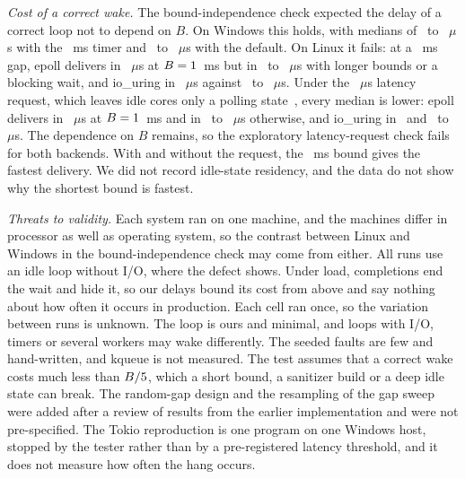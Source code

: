 \emph{Cost of a correct wake.} The bound-independence check expected the delay of a correct loop not to depend on $B$. On
Windows this holds, with medians of \WakeBoundIocpFixedBlockingTimerOneMs\ to
\WakeBoundIocpFixedTenMsTimerOneMs~$\mu$s with the \WakeTimerRequestedMs~ms timer and
\WakeBoundIocpFixedBlockingDefaultTimer\ to \WakeBoundIocpFixedOneHundredMsDefaultTimer~$\mu$s
with the default. On Linux it fails: at a \WakeBoundGapMs~ms gap, epoll delivers in
\WakeBoundEpollFixedOneMs~$\mu$s at $B = 1$~ms but in \WakeBoundEpollFixedTenMs\ to
\WakeBoundEpollFixedOneHundredMs~$\mu$s with longer bounds or a blocking wait, and io\_uring in
\WakeBoundUringFixedOneMs~$\mu$s against \WakeBoundUringFixedOneHundredMs\ to
\WakeBoundUringFixedTenMs~$\mu$s. Under the \WakeQosUs~$\mu$s latency request, which leaves idle
cores only a polling state~\cite{kernel2026cpuidle}, every median is lower: epoll delivers in
\WakeBoundQosEpollFixedOneMsQosZeroUs~$\mu$s at $B = 1$~ms and in
\WakeBoundQosEpollFixedBlockingQosZeroUs\ to \WakeBoundQosEpollFixedTenMsQosZeroUs~$\mu$s
otherwise, and io\_uring in \WakeBoundQosUringFixedOneMsQosZeroUs\ and
\WakeBoundQosUringFixedBlockingQosZeroUs\ to \WakeBoundQosUringFixedTenMsQosZeroUs~$\mu$s. The
dependence on $B$ remains, so the exploratory latency-request check fails for both backends. With and without the
request, the \WakeBSmallMs~ms bound gives the fastest delivery. We did not record idle-state
residency, and the data do not show why the shortest bound is fastest.

\emph{Threats to validity.} Each system ran on one machine, and the machines differ in
processor as well as operating system, so the contrast between Linux and Windows in the
bound-independence check may come
from either. All runs use an idle loop without I/O, where the
defect shows. Under load, completions end the wait and hide it, so our delays bound its cost
from above and say nothing about how often it occurs in production. Each cell ran once, so the
variation between runs is unknown. The loop is ours and minimal, and loops with I/O, timers or
several workers may wake differently. The seeded faults are few and hand-written, and kqueue is
not measured. The test assumes that a correct wake costs much less than $B/5$,
which a short bound, a sanitizer build or a deep idle state can break. The random-gap design and
the resampling of the gap sweep were added after a review of results from the earlier
implementation and were not pre-specified. The Tokio reproduction is one program on one
Windows host, stopped by the tester rather than by a pre-registered latency threshold, and
it does not measure how often the hang occurs.

